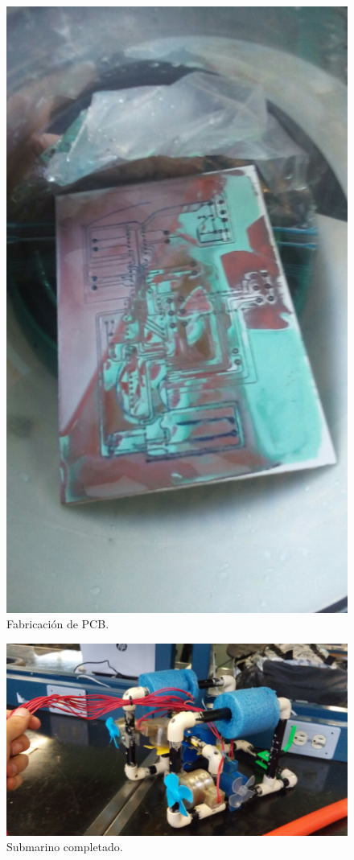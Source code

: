   \begin{figure}[!htbp]
 \centering
 \includegraphics [scale=0.2]
 {./img/IMG-20160426-WA0001.jpg}
 \caption{Fabricaci\'on de PCB.}
 \end{figure}

  \begin{figure}[!htbp]
 \centering
 \includegraphics [scale=0.1]
 {./img/20160428_180525.jpg}
 \caption{Submarino completado.}
 \end{figure}

 \pagebreak
